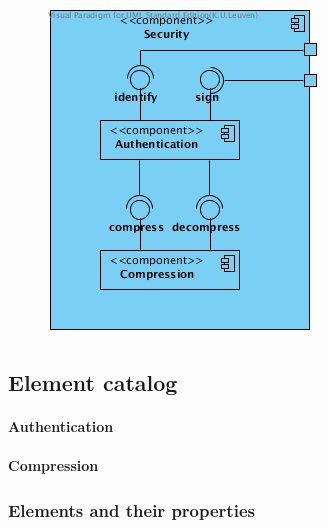 \documentclass[a4paper,10pt]{book}
\begin{document}
\begin{center}
    \begin{figure}
      \includegraphics[width=\textwidth]{../images/ClientServer_Security.png}
    \end{figure}
  \end{center}

\subsection{Element catalog}

\paragraph{Authentication}

\paragraph{Compression}

\subsubsection{Elements and their properties}
\end{document}
